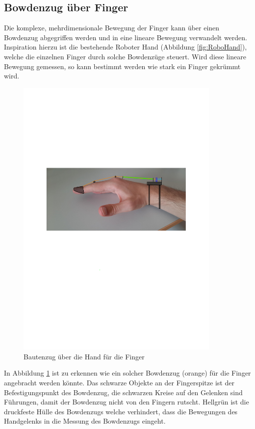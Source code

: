 \documentclass[a4paper,12pt,final]{article} %
\numberwithin{equation}{section} %
\numberwithin{figure}{section} %
\numberwithin{table}{section} %
\begin{document}
\subsection{Bowdenzug über Finger}
Die komplexe, mehrdimensionale Bewegung der Finger kann über einen Bowdenzug abgegriffen werden und in eine lineare Bewegung verwandelt werden.
Inspiration hierzu ist die bestehende Roboter Hand (Abbildung \ref{fig:RoboHand}), welche die einzelnen Finger durch solche Bowdenzüge steuert.
Wird diese lineare Bewegung gemessen, so kann bestimmt werden wie stark ein Finger gekrümmt wird. 
\begin{figure}[H]
	\begin{center}
		\includegraphics[width=10cm]{Bilder/HandPhoto1.pdf}
		\caption{Bautenzug über die Hand für die Finger}
		\label{fig:HandFinger}
	\end{center}
\end{figure}
In Abbildung \ref{fig:HandFinger} ist zu erkennen wie ein solcher Bowdenzug (orange) für die Finger angebracht werden könnte.
Das schwarze Objekte an der Fingerspitze ist der Be\-fest\-ig\-ungs\-punkt des Bowdenzug, die schwarzen Kreise auf den Gelenken sind Führungen, damit der Bowdenzug nicht von den Fingern rutscht.
Hellgrün ist die druckfeste Hülle des Bowdenzugs welche verhindert, dass die Bewegungen des Handgelenks in die Messung des Bowdenzugs eingeht.
\end{document}
